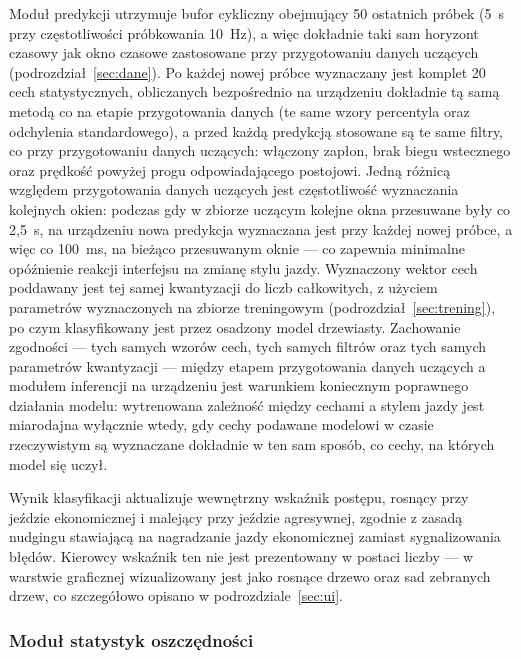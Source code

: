 Moduł predykcji utrzymuje bufor cykliczny obejmujący 50 ostatnich próbek
(5~s przy częstotliwości próbkowania 10~Hz), a więc dokładnie taki sam
horyzont czasowy jak okno czasowe zastosowane przy przygotowaniu danych
uczących (podrozdział~\ref{sec:dane}). Po każdej nowej próbce wyznaczany jest
komplet 20 cech statystycznych, obliczanych bezpośrednio na urządzeniu
dokładnie tą samą metodą co na etapie przygotowania danych (te same wzory percentyla oraz
odchylenia standardowego), a przed każdą predykcją stosowane są te same
filtry, co przy przygotowaniu danych uczących: włączony zapłon, brak biegu
wstecznego oraz prędkość powyżej progu odpowiadającego postojowi. Jedną
różnicą względem przygotowania danych uczących jest częstotliwość
wyznaczania kolejnych okien: podczas gdy w zbiorze uczącym kolejne okna
przesuwane były co 2,5~s, na urządzeniu nowa predykcja wyznaczana jest przy
każdej nowej próbce, a więc co 100~ms, na bieżąco przesuwanym oknie ---
co zapewnia minimalne opóźnienie reakcji interfejsu na zmianę
stylu jazdy. Wyznaczony wektor cech poddawany jest tej samej kwantyzacji do
liczb całkowitych, z użyciem parametrów wyznaczonych na zbiorze treningowym
(podrozdział~\ref{sec:trening}), po czym klasyfikowany jest przez osadzony
model drzewiasty. Zachowanie zgodności --- tych samych wzorów cech, tych
samych filtrów oraz tych samych parametrów kwantyzacji --- między etapem
przygotowania danych uczących a modułem inferencji na urządzeniu jest
warunkiem koniecznym poprawnego działania modelu: wytrenowana zależność
między cechami a stylem jazdy jest miarodajna wyłącznie wtedy, gdy cechy
podawane modelowi w czasie rzeczywistym są wyznaczane dokładnie w ten sam
sposób, co cechy, na których model się uczył.

Wynik klasyfikacji aktualizuje wewnętrzny wskaźnik postępu, rosnący przy
jeździe ekonomicznej i malejący przy jeździe agresywnej, zgodnie z zasadą
nudgingu stawiającą na nagradzanie jazdy ekonomicznej zamiast sygnalizowania
błędów. Kierowcy wskaźnik ten nie jest prezentowany w postaci liczby ---
w warstwie graficznej wizualizowany jest jako rosnące drzewo oraz sad
zebranych drzew, co szczegółowo opisano w podrozdziale~\ref{sec:ui}.

\subsubsection{Moduł statystyk oszczędności}

